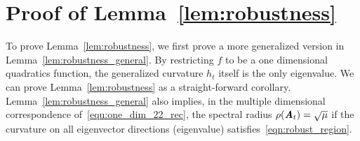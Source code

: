 \newpage
\onecolumn
\section{Proof of Lemma~\ref{lem:robustness}}
\label{sec:proof_robustness}
To prove Lemma~\ref{lem:robustness}, we first prove a more generalized version in Lemma~\ref{lem:robustness_general}. By restricting $f$ to be a one dimensional quadratics function, the generalized curvature $h_t$ itself is the only eigenvalue. We can prove Lemma~\ref{lem:robustness} as a straight-forward corollary. Lemma~\ref{lem:robustness_general} also implies, in the multiple dimensional correspondence of~\eqref{equ:one_dim_22_rec}, the spectral radius $\rho(\bm{\mathit{A}}_t)=\sqrt{\mu}$ if the curvature on all eigenvector directions (eigenvalue) satisfies~\eqref{eqn:robust_region}.

